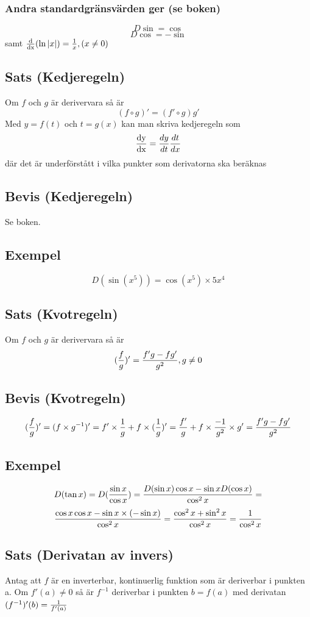 \documentclass{article}
\begin{document}
\subsubsection{Andra standardgränsvärden ger (se boken)}
$$ D\sin = \cos $$
$$ D\cos = -\sin $$
samt $\operatorname{\frac{d}{dx}}(\ln{\lvert x\rvert}) = \frac{1}{x}, (x\neq 0)$

\subsection{Sats (Kedjeregeln)}
Om $f$ och $g$ är derivervara så är
$$ (f\circ g)' = (f'\circ g)g' $$
Med $y=f(t)$ och $t=g(x)$ kan man skriva kedjeregeln som
$$ \operatorname{\frac{dy}{dx}} = \frac{dy}{dt} \frac{dt}{dx} $$
där det är underförstått i vilka punkter som derivatorna ska beräknas

\subsection{Bevis (Kedjeregeln)}
Se boken.

\subsection{Exempel}
$$ D(\sin(x^5)) = \cos(x^5) \times 5x^4 $$

\subsection{Sats (Kvotregeln)}
Om $f$ och $g$ är derivervara så är
$$ (\frac{f}{g})' = \frac{f'g-fg'}{g^2}, g\neq 0 $$

\subsection{Bevis (Kvotregeln)}
$$ (\frac{f}{g})' = (f\times g^{-1})' = f' \times \frac{1}{g} + f\times (\frac{1}{g})' =
\frac{f'}{g} + f\times \frac{-1}{g^2}\times g' = \frac{f'g-fg'}{g^2}$$

\subsection{Exempel}
$$D(\tan x) = D(\frac{\sin x}{\cos x}) = \frac{D(\sin x)\cos x - \sin x D(\cos x)}{\cos^2 x} =$$
$$\frac{\cos x\cos x-\sin x\times (-\sin x)}{\cos^2 x} =
\frac{\cos^2 x + \sin^2 x}{\cos^2 x} = \frac{1}{\cos^2 x}$$

\subsection{Sats (Derivatan av invers)}
Antag att $f$ är en inverterbar, kontinuerlig funktion som är deriverbar i punkten a. Om $f'(a)\neq 0$
så är $f^{-1}$ deriverbar i punkten $b=f(a)$ med derivatan $(f^{-1})'(b) = \frac{1}{f'(a)}$
\end{document}
